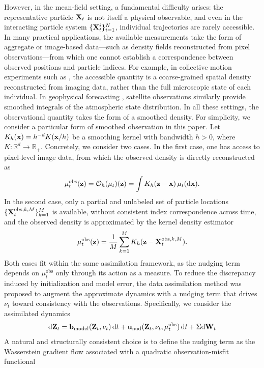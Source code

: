 However, in the mean-field setting, a fundamental difficulty arises: the representative particle $\mathbf{X}_t$ is not itself a physical observable, and even in the interacting particle system $\{\mathbf{X}_t^i\}_{i=1}^N$, individual trajectories are rarely accessible. In many practical applications, the available measurements take the form of aggregate or image-based data—such as density fields reconstructed from pixel observations—from which one cannot establish a correspondence between observed positions and particle indices. For example, in collective motion experiments such as \cite{ballerini2008interaction, cavagna2010scale, zhang2010collective}, the accessible quantity is a coarse-grained spatial density reconstructed from imaging data, rather than the full microscopic state of each individual. In geophysical forecasting \cite{evensen2003ensemble}, satellite observations similarly provide smoothed integrals of the atmospheric state distribution. In all these settings, the observational quantity takes the form of a smoothed density. For simplicity, we consider a particular form of smoothed observation
in this paper. Let $K_h (\mathbf{x}) = h^{-d}K(\mathbf{x}/h)$ be a smoothing kernel with bandwidth $h>0$, where $K:\mathbb R^d \to \mathbb R_+$. Concretely, we consider two cases. In the first case, one has access to pixel-level image data, from which the observed density is directly reconstructed as
\[
\mu_t^{\mathrm{obs}}(\mathbf{z}) = \mathcal{O}_h(\mu_t)(\mathbf{z}) = \int K_h(\mathbf{z} - \mathbf{x})\,\mu_t(\mathrm{d}\mathbf{x}).
\]
In the second case, only a partial and unlabeled set of particle locations $\{\mathbf{X}_t^{\mathrm{obs},k,M}\}_{k=1}^M$ is available, without consistent index correspondence across time, and the observed density is approximated by the kernel density estimator
\[
\mu_t^{\mathrm{obs}}(\mathbf{z}) = \frac{1}{M}\sum_{k=1}^{M} K_h(\mathbf{z} - \mathbf{X}_t^{\mathrm{obs},k,M}).
\]
Both cases fit within the same assimilation framework, as the nudging term depends on $\mu_t^{\mathrm{obs}}$ only through its action as a measure.
To reduce the discrepancy induced by initialization and model error,
the data assimilation method \cite{bessaih2015continuous} was proposed to augment the approximate dynamics with a nudging term that drives $\nu_t$ toward consistency with the observations. Specifically, we consider the assimilated dynamics
\begin{equation}\label{equ:assimilated}
\mathrm{d}\mathbf{Z}_t
= \mathbf{b}_{\mathrm{model}}(\mathbf{Z}_t,\nu_t)\,\mathrm{d} t
+ \mathbf{u}_{\mathrm{nud}}(\mathbf{Z}_t,\nu_t,\mu^{\mathrm{obs}}_t)\,\mathrm{d} t
+ \Sigma \mathrm{d} \mathbf{W}_t
\end{equation}
A natural and structurally consistent choice is to define the nudging term as the Wasserstein gradient flow associated with a quadratic observation-misfit functional
